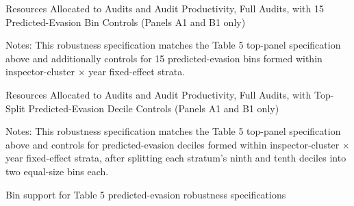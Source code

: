 \documentclass{article}
\newcommand{\OutPath}{Output/}%
\newcommand{\OutPath}{../Output/}%
\begin{document}
\begin{landscape}
\begin{table}[H]\centering
\begin{adjustbox}{max width=1.4\textwidth}
\begin{threeparttable}
\caption{Resources Allocated to Audits and Audit Productivity, Full Audits, with 15 Predicted-Evasion Bin Controls (Panels A1 and B1 only)}
\label{tab:table5_fullaudits_yhatrf_15bins_control}

\footnotesize


\begin{tablenotes}[flushleft]
\footnotesize
\item Notes: This robustness specification matches the Table 5 top-panel specification above and additionally controls for 15 predicted-evasion bins formed within inspector-cluster $\times$ year fixed-effect strata.
\end{tablenotes}
\end{threeparttable}
\end{adjustbox}
\end{table}

\begin{table}[H]\centering
\begin{adjustbox}{max width=1.4\textwidth}
\begin{threeparttable}
\caption{Resources Allocated to Audits and Audit Productivity, Full Audits, with Top-Split Predicted-Evasion Decile Controls (Panels A1 and B1 only)}
\label{tab:table5_fullaudits_yhatrf_topsplit_control}

\footnotesize


\begin{tablenotes}[flushleft]
\footnotesize
\item Notes: This robustness specification matches the Table 5 top-panel specification above and controls for predicted-evasion deciles formed within inspector-cluster $\times$ year fixed-effect strata, after splitting each stratum's ninth and tenth deciles into two equal-size bins each.
\end{tablenotes}
\end{threeparttable}
\end{adjustbox}
\end{table}

\begin{table}[H]\centering
\begin{adjustbox}{max width=1.4\textwidth, max totalheight=0.82\textheight}
\begin{threeparttable}
\caption{Bin support for Table 5 predicted-evasion robustness specifications}
\label{tab:table5_fullaudits_yhatrf_bin_support}


\end{threeparttable}
\end{adjustbox}
\end{table}
\end{landscape}
\end{document}
